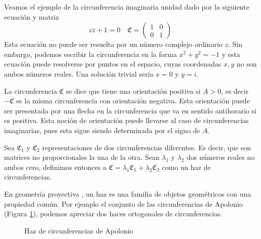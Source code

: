 \documentclass{matematicasud}
\begin{document}
Veamos el ejemplo de la circunferencia imaginaria unidad dado por la siguiente ecuación y matriz
\begin{equation}
    z\bar{z}+1=0 \quad \mathfrak{C}=
    \begin{pmatrix}
        1 & 0 \\
        0 & 1
    \end{pmatrix}.
    \label{eq:(7)}
\end{equation}
Esta ecuación no puede ser resuelta por un número complejo ordinario $z$. Sin embargo, podemos  escribir la circunferencia en la forma $x^2+y^2=-1$ y esta ecuación puede resolverse por puntos en el espacio, cuyas coordenadas $x,y$ no son ambos números reales. Una solución trivial sería $x=0$ y $y=i$.

La circunferencia $\mathfrak{C}$ se dice que tiene una orientación positiva si $A>0$, es decir $-\mathfrak{C}$ es la misma circunferencia con orientación negativa. Esta orientación puede ser presentada por una flecha en la circunferencia que va en sentido antihorario si es positiva. Esta noción de orientación puede llevarse al caso de circunferencias imaginarias, pues esta sigue siendo determinada por el signo de $A$.

Sea $\mathfrak{C}_1$ y $\mathfrak{C}_2$ representaciones de dos circunferencias diferentes. Es decir, que son matrices no proporcionales la una de la otra. Sean $\lambda_1$ y $\lambda_2$ dos números reales no ambos cero, definimos entonces a $\mathfrak{C}=\lambda_1\mathfrak{C}_1+\lambda_2\mathfrak{C}_2$ como un haz de circunferencias.

En geometría proyectiva \cite{halsted1896}, un haz es una familia de objetos geométricos con una propiedad común. Por ejemplo el conjunto de las circunferencias de Apolonio (Figura \ref{fig:Apolonio}), podemos apreciar dos haces ortogonales de circunferencias.

\begin{figure}[!ht]
    \begin{center}
    \end{center}
    \caption{Haz de circunferencias de Apolonio}
    \label{fig:Apolonio}
    \end{figure}
\end{document}
